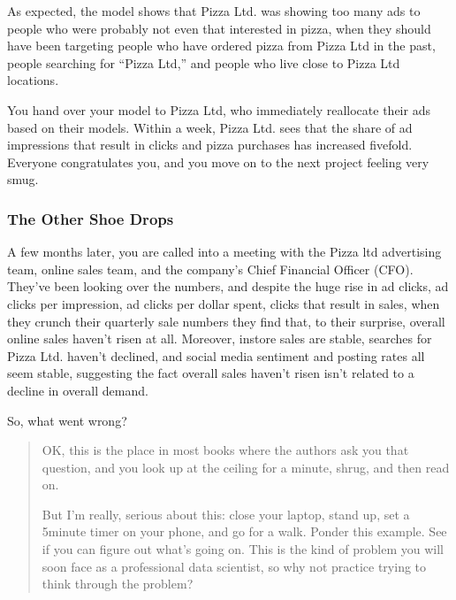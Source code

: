 \documentclass[letterpaper,10pt,english]{jupyterBook}
\begin{document}
\sphinxAtStartPar
As expected, the model shows that Pizza Ltd. was showing too many ads to people who were probably not even that interested in pizza, when they should have been targeting people who have ordered pizza from Pizza Ltd in the past, people searching for “Pizza Ltd,” and people who live close to Pizza Ltd locations.

\sphinxAtStartPar
You hand over your model to Pizza Ltd, who immediately reallocate their ads based on their models. Within a week, Pizza Ltd. sees that the share of ad impressions that result in clicks and pizza purchases has increased five\sphinxhyphen{}fold. Everyone congratulates you, and you move on to the next project feeling very smug.


\subsubsection{The Other Shoe Drops}
\label{\detokenize{20_problems_to_questions/15_solving_the_wrong_problem:the-other-shoe-drops}}
\sphinxAtStartPar
A few months later, you are called into a meeting with the Pizza ltd advertising team, online sales team, and the company’s Chief Financial Officer (CFO). They’ve been looking over the numbers, and despite the huge rise in ad clicks, ad clicks per impression, ad clicks per dollar spent,  clicks that result in sales, when they crunch their quarterly sale numbers they find that, to their surprise, overall online sales haven’t risen at all. Moreover, in\sphinxhyphen{}store sales are stable, searches for Pizza Ltd. haven’t declined, and social media sentiment and posting rates all seem stable, suggesting the fact overall sales haven’t risen isn’t related to a decline in overall demand.

\sphinxAtStartPar
So, what went wrong?
\begin{quote}

\sphinxAtStartPar
OK, this is the place in most books where the authors ask you that question, and you look up at the ceiling for a minute, shrug, and then read on.

\sphinxAtStartPar
But I’m really,  serious about this: close your laptop, stand up, set a 5\sphinxhyphen{}minute timer on your phone, and go for a walk. Ponder this example. See if you can figure out what’s going on. This is  the kind of problem you will soon face as a professional data scientist, so why not practice trying to think through the problem?
\end{quote}
\end{document}

